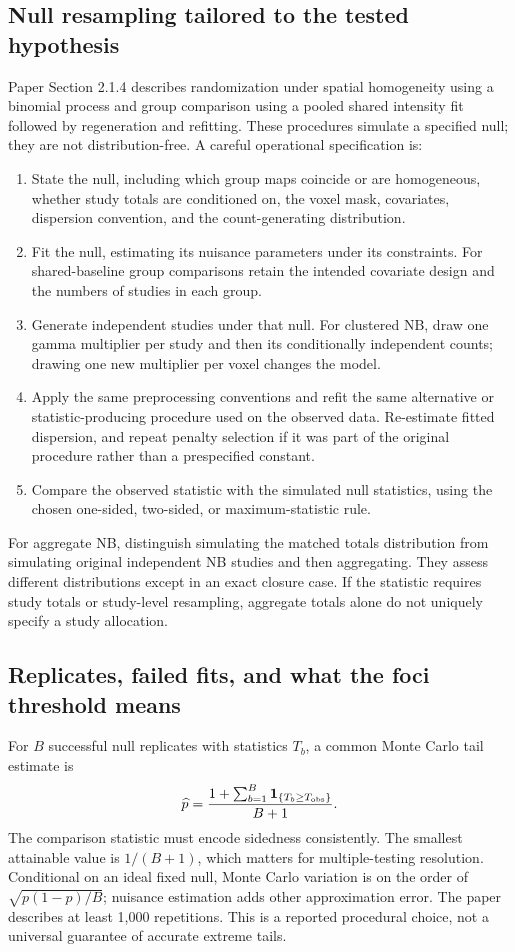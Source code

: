 \documentclass[11pt,a4paper]{article}
\numberwithin{equation}{section}
\begin{document}
\subsection{Null resampling tailored to the tested hypothesis}
Paper Section 2.1.4 describes randomization under spatial homogeneity
using a binomial process and group comparison using a pooled shared
intensity fit followed by regeneration and refitting.
These procedures simulate a specified null; they are not distribution-free.
A careful operational specification is:
\begin{enumerate}
 \item State the null, including which group maps coincide or are
 homogeneous, whether study totals are conditioned on, the voxel mask,
 covariates, dispersion convention, and the count-generating distribution.
 \item Fit the null, estimating its nuisance parameters under its
 constraints. For shared-baseline group comparisons retain the intended
 covariate design and the numbers of studies in each group.
 \item Generate independent studies under that null. For clustered NB,
 draw one gamma multiplier per study and then its conditionally
 independent counts; drawing one new multiplier per voxel changes the model.
 \item Apply the same preprocessing conventions and refit the same
 alternative or statistic-producing procedure used on the observed data.
 Re-estimate fitted dispersion, and repeat penalty selection if it was
 part of the original procedure rather than a prespecified constant.
 \item Compare the observed statistic with the simulated null statistics,
 using the chosen one-sided, two-sided, or maximum-statistic rule.
\end{enumerate}
For aggregate NB, distinguish simulating the matched totals distribution
from simulating original independent NB studies and then aggregating.
They assess different distributions except in an exact closure case.
If the statistic requires study totals or study-level resampling, aggregate
totals alone do not uniquely specify a study allocation.

\subsection{Replicates, failed fits, and what the foci threshold means}
For $B$ successful null replicates with statistics $T_b$, a common
Monte Carlo tail estimate is
\begin{equation}
 \widehat p=\frac{1+\sum_{b=1}^B\mathbf1_{\{T_b\geq T_{\rm obs}\}}}{B+1}.
\end{equation}
The comparison statistic must encode sidedness consistently.
The smallest attainable value is $1/(B+1)$, which matters for
multiple-testing resolution. Conditional on an ideal fixed null,
Monte Carlo variation is on the order of
$\sqrt{p(1-p)/B}$; nuisance estimation adds other approximation error.
The paper describes at least 1,000 repetitions.
This is a reported procedural choice, not a universal guarantee of
accurate extreme tails.
\end{document}
